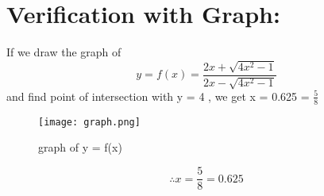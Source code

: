 \documentclass[twocolumn]{article}
\begin{document}
\section*{Verification with Graph:}
If we draw the graph of 
\begin{equation*} 
y = f(x) = \frac{2x+\sqrt{4x^2-1}}{2x-\sqrt{4x^2-1}}
\end{equation*}
 and find point of intersection with y = 4  , we get  x = 0.625 = $\frac{5}{8}$
\begin{figure}[h]
\texttt{[image: graph.png]}
\caption{graph of y = f(x)}
\end{figure}
\begin{equation*}
\therefore x = \frac{5}{8} = 0.625 
\end{equation*}
\end{document}
